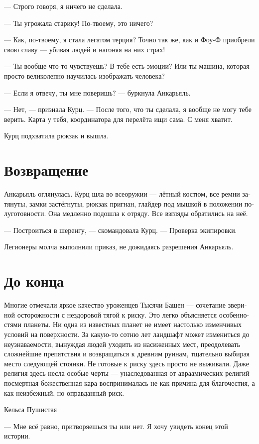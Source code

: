 \documentclass[a4paper,12pt,fleqn]{book}\usepackage{polyglossia}\setdefaultlanguage[babelshorthands=true]{russian}\setotherlanguage{english}\defaultfontfeatures{Ligatures=TeX,Mapping=tex-text}\usepackage{xcolor}\newcommand{\ml}[3]{#2}
\begin{document}
--- Строго говоря, я ничего не сделала.

--- Ты угрожала старику!
По-твоему, это ничего?

--- Как, по-твоему, я стала легатом терция?
Точно так же, как и Фоу-Ф приобрели свою славу --- убивая людей и нагоняя на них страх!

--- Ты вообще что-то чувствуешь?
В тебе есть эмоции?
Или ты машина, которая просто великолепно научилась изображать человека?

--- Если я отвечу, ты мне поверишь? --- буркнула Анкарьяль.

--- Нет, --- признала Курц.
--- После того, что ты сделала, я вообще не могу тебе верить.
Карта у тебя, координатора для перелёта ищи сама.
С меня хватит.

Курц подхватила рюкзак и вышла.

\section{Возвращение}

Анкарьяль оглянулась.
Курц шла во всеоружии --- лётный костюм, все ремни затянуты, замки застёгнуты, рюкзак пригнан, глайдер под мышкой в положении полуготовности.
Она медленно подошла к отряду.
Все взгляды обратились на неё.

--- Построиться в шеренгу, --- скомандовала Курц.
--- Проверка экипировки.

Легионеры молча выполнили приказ, не дожидаясь разрешения Анкарьяль.

\section{До конца}

\epigraph{Многие отмечали яркое качество уроженцев Тысячи Башен --- сочетание звериной осторожности с нездоровой тягой к риску.
Это легко объясняется особенностями планеты.
Ни одна из известных планет не имеет настолько изменчивых условий на поверхности.
За какую-то сотню лет ландшафт может измениться до неузнаваемости, вынуждая людей уходить из насиженных мест, преодолевать сложнейшие препятствия и возвращаться к древним руинам, тщательно выбирая место следующей стоянки.
Не готовые к риску здесь просто не выживали.
Даже религия здесь несла особые черты --- унаследованная от авраамических религий посмертная божественная кара воспринималась не как причина для благочестия, а как неизбежный, но оправданный риск.
}{Кельса Пушистая}

--- Мне всё равно, притворяешься ты или нет.
Я хочу увидеть конец этой истории.
\end{document}
